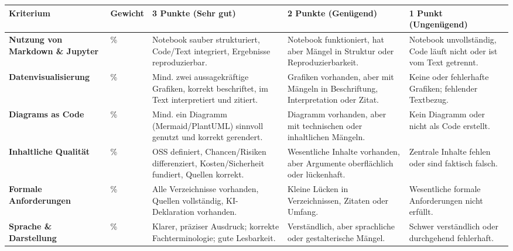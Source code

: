 \documentclass[
  nswissgerman,
  a4paper,
  DIV=11,
  numbers=noendperiod,
  ngerman]{scrreprt}
\newcounter{none} %
\begin{document}
{\def\LTcaptype{none} %
\begin{longtable}[]{@{}
  >{\raggedright\arraybackslash}p{}
  >{\raggedright\arraybackslash}p{}
  >{\raggedright\arraybackslash}p{}
  >{\raggedright\arraybackslash}p{}
  >{\raggedright\arraybackslash}p{}@{}}
\toprule\noalign{}
\begin{minipage}[b]{\linewidth}\raggedright
Kriterium
\end{minipage} & \begin{minipage}[b]{\linewidth}\raggedright
Gewicht
\end{minipage} & \begin{minipage}[b]{\linewidth}\raggedright
3 Punkte (Sehr gut)
\end{minipage} & \begin{minipage}[b]{\linewidth}\raggedright
2 Punkte (Genügend)
\end{minipage} & \begin{minipage}[b]{\linewidth}\raggedright
1 Punkt (Ungenügend)
\end{minipage} \\
\midrule\noalign{}
\endhead
\bottomrule\noalign{}
\endlastfoot
\textbf{Nutzung von Markdown \& Jupyter} & 25\% & Notebook sauber
strukturiert, Code/Text integriert, Ergebnisse reproduzierbar. &
Notebook funktioniert, hat aber Mängel in Struktur oder
Reproduzierbarkeit. & Notebook unvollständig, Code läuft nicht oder ist
vom Text getrennt. \\
\textbf{Datenvisualisierung} & 20\% & Mind. zwei aussagekräftige
Grafiken, korrekt beschriftet, im Text interpretiert und zitiert. &
Grafiken vorhanden, aber mit Mängeln in Beschriftung, Interpretation
oder Zitat. & Keine oder fehlerhafte Grafiken; fehlender Textbezug. \\
\textbf{Diagrams as Code} & 10\% & Mind. ein Diagramm (Mermaid/PlantUML)
sinnvoll genutzt und korrekt gerendert. & Diagramm vorhanden, aber mit
technischen oder inhaltlichen Mängeln. & Kein Diagramm oder nicht als
Code erstellt. \\
\textbf{Inhaltliche Qualität} & 25\% & OSS definiert, Chancen/Risiken
differenziert, Kosten/Sicherheit fundiert, Quellen korrekt. &
Wesentliche Inhalte vorhanden, aber Argumente oberflächlich oder
lückenhaft. & Zentrale Inhalte fehlen oder sind faktisch falsch. \\
\textbf{Formale Anforderungen} & 10\% & Alle Verzeichnisse vorhanden,
Quellen vollständig, KI-Deklaration vorhanden. & Kleine Lücken in
Verzeichnissen, Zitaten oder Umfang. & Wesentliche formale Anforderungen
nicht erfüllt. \\
\textbf{Sprache \& Darstellung} & 10\% & Klarer, präziser Ausdruck;
korrekte Fachterminologie; gute Lesbarkeit. & Verständlich, aber
sprachliche oder gestalterische Mängel. & Schwer verständlich oder
durchgehend fehlerhaft. \\
\end{longtable}
}
\end{document}
